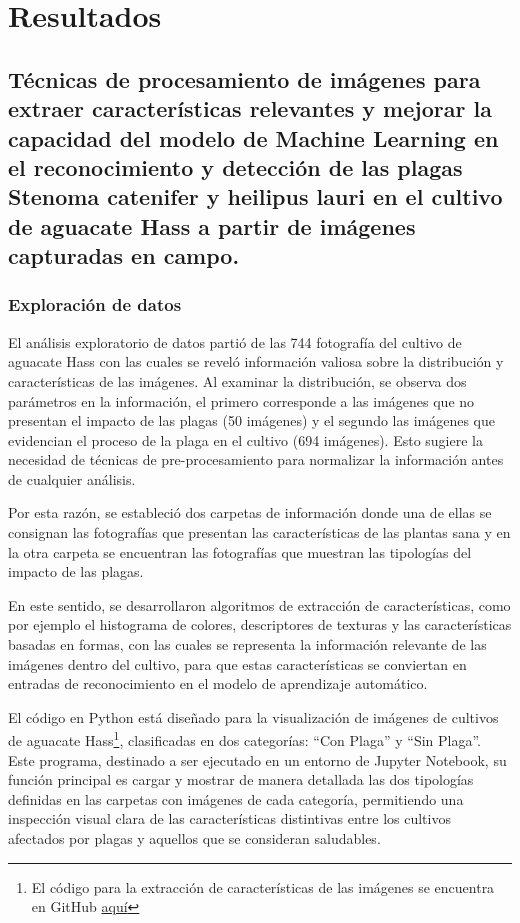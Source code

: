 \section{Resultados}

\subsection{Técnicas de procesamiento de imágenes para extraer características relevantes y mejorar la capacidad del modelo de Machine Learning en el reconocimiento y detección de las plagas Stenoma catenifer y heilipus lauri en el cultivo de aguacate Hass a partir de imágenes capturadas en campo.}

\subsubsection{Exploración de datos}

El análisis exploratorio de datos partió de las 744 fotografía del cultivo de aguacate Hass con las cuales se reveló información valiosa sobre la distribución y características de las imágenes. Al examinar la distribución, se observa dos parámetros en la información, el primero corresponde a las imágenes que no presentan el impacto de las plagas (50 imágenes) y el segundo las imágenes que evidencian el proceso de la plaga en el cultivo (694 imágenes). Esto sugiere la necesidad de técnicas de pre-procesamiento para normalizar la información antes de cualquier análisis.

Por esta razón, se estableció dos carpetas de información donde una de ellas se consignan las fotografías que presentan las características de las plantas sana y en la otra carpeta se encuentran las fotografías que muestran las tipologías del impacto de las plagas.

En este sentido, se desarrollaron algoritmos de extracción de características, como por ejemplo el histograma de colores, descriptores de texturas y las características basadas en formas, con las cuales se representa la información relevante de las imágenes dentro del cultivo, para que estas características se conviertan en entradas de reconocimiento en el modelo de aprendizaje automático.

El código en Python está diseñado para la visualización de imágenes de cultivos de aguacate Hass\footnote{El código para la extracción de características de las imágenes se encuentra en GitHub \href{https://github.com/juferoto/mlops_project/blob/master/notebooks/analisisExploratorio.ipynb}{aquí}}, clasificadas en dos categorías: ``Con Plaga'' y ``Sin Plaga''. Este programa, destinado a ser ejecutado en un entorno de Jupyter Notebook, su función principal es cargar y mostrar de manera detallada las dos tipologías definidas en las carpetas con imágenes de cada categoría, permitiendo una inspección visual clara de las características distintivas entre los cultivos afectados por plagas y aquellos que se consideran saludables.

